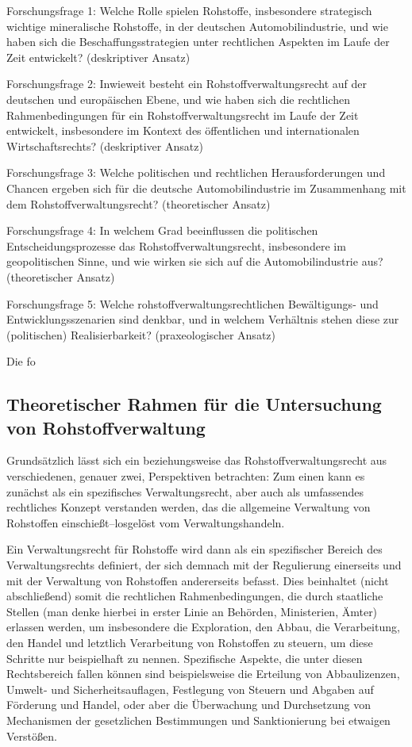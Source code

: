 \documentclass[12pt,a4paper,oneside]{book} %
\begin{document}
Forschungsfrage 1: Welche Rolle spielen Rohstoffe, insbesondere strategisch wichtige mineralische Rohstoffe, in der deutschen Automobilindustrie, und wie haben sich die Beschaffungsstrategien unter rechtlichen Aspekten im Laufe der Zeit entwickelt? (deskriptiver Ansatz)

Forschungsfrage 2: Inwieweit besteht ein Rohstoffverwaltungsrecht auf der deutschen und europäischen Ebene, und wie haben sich die rechtlichen Rahmenbedingungen für ein Rohstoffverwaltungsrecht im Laufe der Zeit entwickelt, insbesondere im Kontext des öffentlichen und internationalen Wirtschaftsrechts? (deskriptiver Ansatz)

Forschungsfrage 3: Welche politischen und rechtlichen Herausforderungen und Chancen ergeben sich für die deutsche Automobilindustrie im Zusammenhang mit dem Rohstoffverwaltungsrecht? (theoretischer Ansatz)

Forschungsfrage 4: In welchem Grad beeinflussen die politischen Entscheidungsprozesse das Rohstoffverwaltungsrecht, insbesondere im geopolitischen Sinne, und wie wirken sie sich auf die Automobilindustrie aus? (theoretischer Ansatz)

Forschungsfrage 5: Welche rohstoffverwaltungsrechtlichen Bewältigungs- und Entwicklungsszenarien sind denkbar, und in welchem Verhältnis stehen diese zur (politischen) Realisierbarkeit? (praxeologischer Ansatz)





Die fo
\subsection{Theoretischer Rahmen für die Untersuchung von Rohstoffverwaltung}
Grundsätzlich lässt sich ein beziehungsweise das Rohstoffverwaltungsrecht aus verschiedenen, genauer zwei, Perspektiven betrachten: Zum einen kann es zunächst als ein spezifisches Verwaltungsrecht, aber auch als umfassendes rechtliches Konzept verstanden werden, das die allgemeine Verwaltung von Rohstoffen einschießt--losgelöst vom Verwaltungshandeln.

Ein Verwaltungsrecht für Rohstoffe wird dann als ein spezifischer Bereich des Verwaltungsrechts definiert, der sich demnach mit der Regulierung einerseits und mit der Verwaltung von Rohstoffen andererseits befasst. Dies beinhaltet (nicht abschließend) somit die rechtlichen Rahmenbedingungen, die durch staatliche Stellen (man denke hierbei in erster Linie an Behörden, Ministerien, Ämter) erlassen werden, um insbesondere die Exploration, den Abbau, die Verarbeitung, den Handel und letztlich Verarbeitung von Rohstoffen zu steuern, um diese Schritte nur beispielhaft zu nennen. Spezifische Aspekte, die unter diesen Rechtsbereich fallen können sind beispielsweise die Erteilung von Abbaulizenzen, Umwelt- und Sicherheitsauflagen, Festlegung von Steuern und Abgaben auf Förderung und Handel, oder aber die Überwachung und Durchsetzung von Mechanismen der gesetzlichen Bestimmungen und Sanktionierung bei etwaigen Verstößen.
\end{document}
